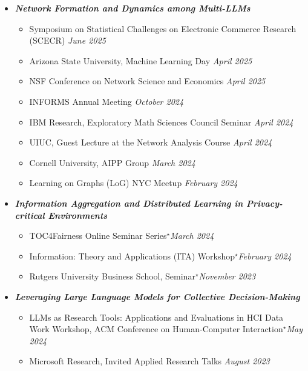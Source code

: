 \documentclass[margin]{res}
\newcommand{\presentedbycoauthor}[0]{\ensuremath {^{\star}}}
\newcommand{\bemph}[1]{\textbf{\emph{#1}}}
\begin{document}
\begin{resume}
\begin{itemize}[nosep]
	\item \bemph{Network Formation and Dynamics among Multi-LLMs}
	\begin{itemize}[nosep]
		\item Symposium on Statistical Challenges on Electronic Commerce Research (SCECR) \hfill \emph{June 2025}
		\item Arizona State University, Machine Learning Day \hfill \emph{April 2025}
		\item NSF Conference on Network Science and Economics \hfill \emph{April 2025}
		\item INFORMS Annual Meeting \hfill \emph{October 2024}
		\item IBM Research, Exploratory Math Sciences Council Seminar  \hfill \emph{April 2024} 
		\item UIUC, Guest Lecture at the Network Analysis Course \hfill \emph{April 2024}
		\item Cornell University, AIPP Group \hfill \emph{March 2024}
		\item Learning on Graphs (LoG) NYC Meetup \hfill \emph{February 2024}
	\end{itemize}
	
	\item \bemph{Information Aggregation and Distributed Learning in Privacy-critical Environments}
	\begin{itemize}[nosep]
	\item  TOC4Fairness Online Seminar Series\presentedbycoauthor \hfill \emph{March 2024}
	\item Information: Theory and Applications (ITA) Workshop\presentedbycoauthor \hfill \emph{February 2024}
	\item Rutgers University Business School, Seminar\presentedbycoauthor \hfill \emph{November 2023}	
	\end{itemize}

	\item \bemph{Leveraging Large Language Models for Collective Decision-Making}
	\begin{itemize}[nosep]
		\item LLMs as Research Tools: Applications and Evaluations in HCI Data Work Workshop, ACM Conference on Human-Computer Interaction\presentedbycoauthor \hfill \emph{May 2024}
		\item Microsoft Research, Invited Applied Research Talks \hfill \emph{August 2023}
	\end{itemize}


\end{itemize}
\end{resume}
\end{document}

